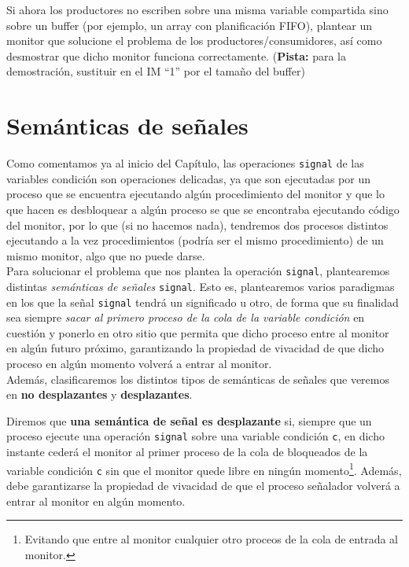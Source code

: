 \begin{ejercicio*}
    Si ahora los productores no escriben sobre una misma variable compartida sino sobre un buffer (por ejemplo, un array con planificación FIFO), plantear un monitor que solucione el problema de los productores/consumidores, así como desmostrar que dicho monitor funciona correctamente.\newline
    (\textbf{Pista:} para la demostración, sustituir en el IM ``1'' por el tamaño del buffer)
\end{ejercicio*}

\section{Semánticas de señales}
Como comentamos ya al inicio del Capítulo, las operaciones \verb|signal| de las variables condición son operaciones delicadas, ya que son ejecutadas por un proceso que se encuentra ejecutando algún procedimiento del monitor y que lo que hacen es desbloquear a algún proceso se que se encontraba ejecutando código del monitor, por lo que (si no hacemos nada), tendremos dos procesos distintos ejecutando a la vez procedimientos (podría ser el mismo procedimiento) de un mismo monitor, algo que no puede darse.\\

Para solucionar el problema que nos plantea la operación \verb|signal|, plantearemos distintas \textit{semánticas de señales} \verb|signal|. Esto es, plantearemos varios paradigmas en los que la señal \verb|signal| tendrá un significado u otro, de forma que su finalidad sea siempre \textit{sacar al primero proceso de la cola de la variable condición} en cuestión y ponerlo en otro sitio que permita que dicho proceso entre al monitor en algún futuro próximo, garantizando la propiedad de vivacidad de que dicho proceso en algún momento volverá a entrar al monitor.\\

Además, clasificaremos los distintos tipos de semánticas de señales que veremos en \textbf{no desplazantes} y \textbf{desplazantes}.

\begin{definicion}
    Diremos que \textbf{una semántica de señal es desplazante} si, siempre que un proceso ejecute una operación \verb|signal| sobre una variable condición \verb|c|, en dicho instante cederá el monitor al primer proceso de la cola de bloqueados de la variable condición \verb|c| sin que el monitor quede libre en ningún momento\footnote{Evitando que entre al monitor cualquier otro proceos de la cola de entrada al monitor.}. Además, debe garantizarse la propiedad de vivacidad de que el proceso señalador volverá a entrar al monitor en algún momento.
\end{definicion}


